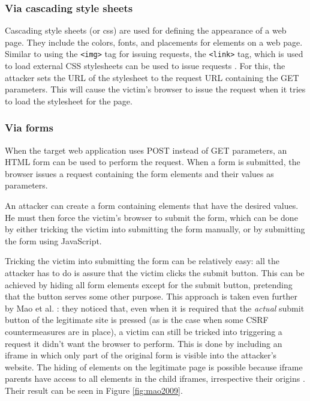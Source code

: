 \subsubsection{Via cascading style sheets}

Cascading style sheets (or \gls{css}) are used for defining the appearance of a web page. They include the colors, fonts, and placements for elements on a web page. Similar to using the \texttt{<img>} tag for issuing requests, the \texttt{<link>} tag, which is used to load external CSS stylesheets can be used to issue requests \cite{Huang2010}. For this, the attacker sets the URL of the stylesheet to the request URL containing the GET parameters. This will cause the victim's browser to issue the request when it tries to load the stylesheet for the page.

\subsubsection{Via forms}\label{forms}

When the target web application uses POST instead of GET parameters, an HTML form can be used to perform the request. When a form is submitted, the browser issues a request containing the form elements and their values as parameters.

An attacker can create a form containing elements that have the desired values. He must then force the victim's browser to submit the form, which can be done by either tricking the victim into submitting the form manually, or by submitting the form using JavaScript.

Tricking the victim into submitting the form can be relatively easy: all the attacker has to do is assure that the victim clicks the submit button. This can be achieved by hiding all form elements except for the submit button, pretending that the button serves some other purpose. This approach is taken even further by Mao et al. \cite{Mao2009}: they noticed that, even when it is required that the \emph{actual} submit button of the legitimate site is pressed (as is the case when some CSRF countermeasures \cite{Jovanovic2006,Johns2006} are in place), a victim can still be tricked into triggering a request it didn't want the browser to perform. This is done by including an iframe in which only part of the original form is visible into the attacker's website. The hiding of elements on the legitimate page is possible because iframe parents have access to all elements in the child iframes, irrespective their origins \cite{Singh2010}. Their result can be seen in Figure \ref{fig:mao2009}.

